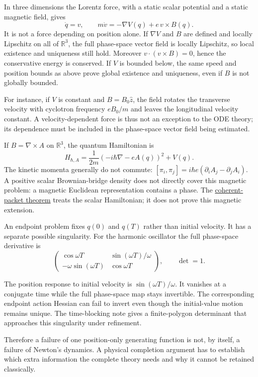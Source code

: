 \documentclass[11pt,a4paper]{article}
\begin{document}
In three dimensions the Lorentz force, with a static scalar potential
and a static magnetic field, gives \[
 \dot q=v,\qquad m\dot v=-\nabla V(q)+e\,v\times B(q).
\] It is not a force depending on position alone. If \(\nabla V\) and
\(B\) are defined and locally Lipschitz on all of \(\mathbb R^3\), the
full phase-space vector field is locally Lipschitz, so local existence
and uniqueness still hold. Moreover \(v\cdot(v\times B)=0\), hence the
conservative energy is conserved. If \(V\) is bounded below, the same
speed and position bounds as above prove global existence and
uniqueness, even if \(B\) is not globally bounded.

For instance, if \(V\) is constant and \(B=B_0\hat z\), the field
rotates the transverse velocity with cyclotron frequency \(eB_0/m\) and
leaves the longitudinal velocity constant. A velocity-dependent force is
thus not an exception to the ODE theory; its dependence must be included
in the phase-space vector field being estimated.

If \(B=\nabla\times A\) on \(\mathbb R^3\), the quantum Hamiltonian is
\[H_{\hbar,A}=\frac1{2m}(-i\hbar\nabla-eA(q))^2+V(q).\] The kinetic
momenta generally do not commute:
\([\pi_i,\pi_j]=i\hbar e(\partial_iA_j-\partial_jA_i)\). A positive
scalar Brownian-bridge density does not directly cover this magnetic
problem: a magnetic Euclidean representation contains a phase. The
\href{quantum-blocks-construct-newton.md}{coherent-packet theorem}
treats the scalar Hamiltonian; it does not prove this magnetic
extension.

An endpoint problem fixes \(q(0)\) and \(q(T)\) rather than initial
velocity. It has a separate possible singularity. For the harmonic
oscillator the full phase-space derivative is \[
 \begin{pmatrix}
 \cos\omega T&\sin(\omega T)/\omega\\
 -\omega\sin(\omega T)&\cos\omega T
 \end{pmatrix},\qquad \det=1.
\]

The position response to initial velocity is \(\sin(\omega T)/\omega\).
It vanishes at a conjugate time while the full phase-space map stays
invertible. The corresponding endpoint action Hessian can fail to invert
even though the initial-value motion remains unique. The time-blocking
note gives a finite-polygon determinant that approaches this singularity
under refinement.

Therefore a failure of one position-only generating function is not, by
itself, a failure of Newton's dynamics. A physical completion argument
has to establish which extra information the complete theory needs and
why it cannot be retained classically.
\end{document}
